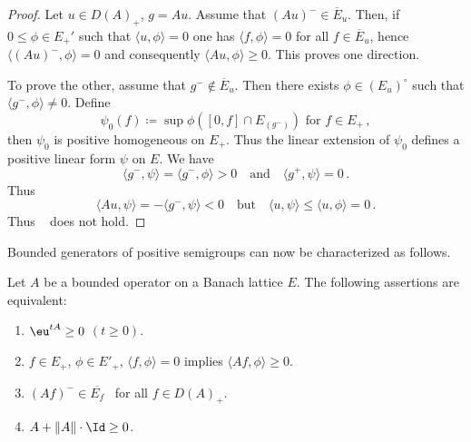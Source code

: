 \begin{proof}
Let $u \in D(A)_{+}$, $g = Au$.
Assume that $(Au)^{-} \in \overline{E}_{u}$.
Then, if\/ $0 \leq \phi \in E_{+}'$ such that $\langle u,\phi \rangle = 0$ one has $\langle f,\phi \rangle = 0$ for all $f \in \overline{E}_{u}$, hence $\langle (Au)^{-},\phi \rangle = 0$ and consequently $\langle Au,\phi \rangle \geq 0$.
This proves one direction.

To prove the other, assume that $g^{-} \not\in \overline{E}_{u}$.
Then there exists $\phi \in (E_{u})^{\circ}$ such that $\langle g^{-},\phi \rangle \not= 0$.
Define 
\[
\psi_{0}(f) \coloneq \sup \phi([0,f] \cap E_{(g^{-})}) \text{ for } f \in E_{+}\,,
\]
then $\psi_{0}$ is positive homogeneous on $E_{+}$.
Thus the linear extension of\/ $\psi_{0}$ defines a positive linear form $\psi$ on $E$.
We have 
\[
\langle g^{-},\psi \rangle = \langle g^{-},\phi \rangle > 0 \quad\text{and}\quad \langle g^{+},\psi \rangle = 0\,.
\]
Thus 
\[
\langle Au,\psi \rangle = - \langle g^{-},\psi \rangle < 0\quad\text{but} \quad\langle u,\psi \rangle \leq \langle u,\phi \rangle = 0\,.
\]
Thus  ~   does not hold.
\end{proof}
Bounded generators of positive semigroups can now be characterized as follows.
\begin{theorem}\label{thm:c2-1.11}
%
Let $A$ be a bounded operator on a Banach lattice $E$.
The following assertions are equivalent:
\begin{enumerate}[\upshape (a)] 
\item \label{thm:c2-1.11-1}
$\eu^{tA} \geq 0$ $(t \geq 0)$.
\item \label{thm:c2-1.11-2}
$f \in E_{+}$, $\phi \in E'_{+}$, $\langle f,\phi \rangle = 0$ implies $\langle Af,\phi \rangle \geq 0$.
\item \label{thm:c2-1.11-3}
$(Af)^{-} \in \overline{E_{f}}$ \ for all $f \in D(A)_{+}$.
\item \label{thm:c2-1.11-4}
$A + \|A\| \cdot \Id \geq 0$.
\end{enumerate}
\end{theorem}
